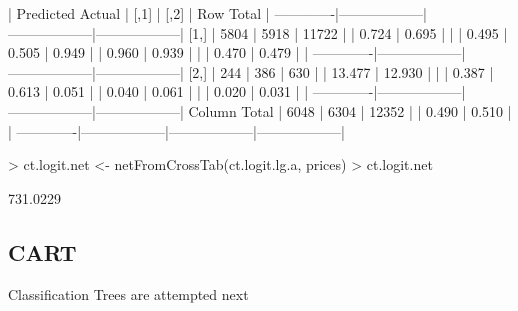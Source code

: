 \documentclass{article}
\begin{document}
\begin{Schunk}
\begin{Soutput}
 
             | Predicted 
      Actual |             [,1] |             [,2] |        Row Total | 
-------------|------------------|------------------|------------------|
        [1,] |             5804 |             5918 |            11722 | 
             |            0.724 |            0.695 |                  | 
             |            0.495 |            0.505 |            0.949 | 
             |            0.960 |            0.939 |                  | 
             |            0.470 |            0.479 |                  | 
-------------|------------------|------------------|------------------|
        [2,] |              244 |              386 |              630 | 
             |           13.477 |           12.930 |                  | 
             |            0.387 |            0.613 |            0.051 | 
             |            0.040 |            0.061 |                  | 
             |            0.020 |            0.031 |                  | 
-------------|------------------|------------------|------------------|
Column Total |             6048 |             6304 |            12352 | 
             |            0.490 |            0.510 |                  | 
-------------|------------------|------------------|------------------|
\end{Soutput}
\begin{Sinput}
> ct.logit.net <- netFromCrossTab(ct.logit.lg.a, prices)
> ct.logit.net
\end{Sinput}
\begin{Soutput}
[1] 731.0229
\end{Soutput}
\end{Schunk}

\subsection*{CART}
Classification Trees are attempted next
\end{document}
